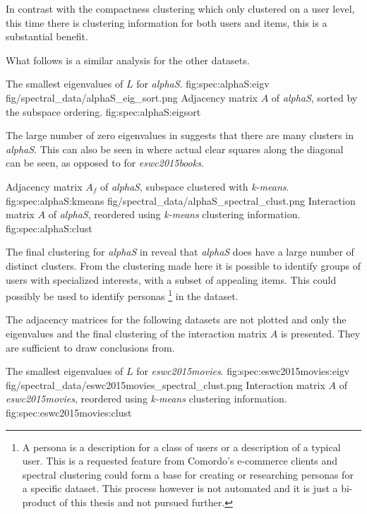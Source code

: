 In contrast with the compactness clustering which only clustered on a user level, this time there is clustering information for both users and items, this is a substantial benefit.

What follows is a similar analysis for the other datasets.

\FloatBarrier

{The smallest eigenvalues of $L$ for \textit{alphaS}.}
{fig:spec:alphaS:eigv}
{fig/spectral_data/alphaS_eig_sort.png}
{Adjacency matrix $A$ of \textit{alphaS}, sorted by the subspace ordering.}
{fig:spec:alphaS:eigsort}

The large number of zero eigenvalues in  suggests that there are many clusters in \textit{alphaS}. This can also be seen in  where actual clear squares along the diagonal can be seen, as opposed to  for \textit{eswc2015books}.

{Adjacency matrix $A_f$ of \textit{alphaS}, subspace clustered with \textit{k-means}.}
{fig:spec:alphaS:kmeans}
{fig/spectral_data/alphaS_spectral_clust.png}
{Interaction matrix $A$ of \textit{alphaS}, reordered using \textit{k-means} clustering information.}
{fig:spec:alphaS:clust}

\FloatBarrier

The final clustering for \textit{alphaS} in  reveal that \textit{alphaS} does have a large number of distinct clusters.  From the clustering made here it is possible to identify groups of users with specialized interests, with a subset of appealing items. This could possibly be used to identify personas
\footnote{
A persona is a description for a class of users or a description of a typical user.
This is a requested feature from Comordo's e-commerce clients and spectral clustering could form a base for creating or researching personas for a specific dataset. This process however is not automated and it is just a bi-product of this thesis and not pursued further.
}
in the dataset.

\newpage
The adjacency matrices for the following datasets are not plotted and only the eigenvalues and the final clustering of the interaction matrix $A$ is presented. They are sufficient to draw conclusions from.

\FloatBarrier

{The smallest eigenvalues of $L$ for \textit{eswc2015movies}.}
{fig:spec:eswc2015movies:eigv}
{fig/spectral_data/eswc2015movies_spectral_clust.png}
{Interaction matrix $A$ of \textit{eswc2015movies}, reordered using \textit{k-means} clustering information.}
{fig:spec:eswc2015movies:clust}

